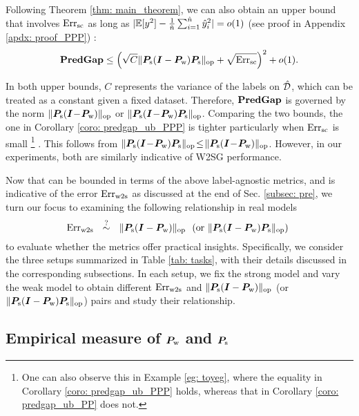 \begin{corollary}\label{coro: predgap_ub_PPP}
Following Theorem \ref{thm: main_theorem}, we can also obtain an upper bound that involves $\text{Err}_{\text{sc}}$ as long as $|\mathbb{E}[y^2]- \frac{1}{\hat{n}}\sum_{i=1}^{\hat{n}}\hat{y}_i^2 |=o(1)$ (see proof in Appendix \ref{apdx: proof_PPP}) :
$$
\textbf{PredGap}{} \leq \left( \sqrt{C} \lVert {\bm{P}}_{\text{s}} ({\bm{I}} - {\bm{P}}_{\text{w}}) {\bm{P}}_{\text{s}} \rVert_{\mathrm{op}} + \sqrt{\text{Err}_{\text{sc}}} \right)^2 + o(1).
$$
\end{corollary}
In both upper bounds, $C$ represents the variance of the labels on $\hat{{\mathcal{D}}}$, which can be treated as a constant given a fixed dataset. Therefore, $\textbf{PredGap}{}$ is governed by the norm $\lVert {\bm{P}}_{\text{s}} ({\bm{I}} \!-\!{\bm{P}}_{\text{w}} )  \rVert_{\mathrm{op}}$ or  $\lVert {\bm{P}}_{\text{s}} ({\bm{I}} \!-\! {\bm{P}}_{\text{w}}) {\bm{P}}_{\text{s}} \rVert_{\mathrm{op}} $. Comparing the two bounds, the one in Corollary \ref{coro: predgap_ub_PPP} is tighter particularly when  $\text{Err}_{\text{sc}}$ is small \footnote{One can also observe this in Example \ref{eg: toyeg}, where the equality in Corollary \ref{coro: predgap_ub_PPP} holds, whereas that in Corollary \ref{coro: predgap_ub_PP} does not.} . This follows from $\lVert {\bm{P}}_{\text{s}} ({\bm{I}}\! -\! {\bm{P}}_{\text{w}}) {\bm{P}}_{\text{s}} \rVert_{\mathrm{op}} \!\leq\! \lVert {\bm{P}}_{\text{s}} ({\bm{I}}\! -\! {\bm{P}}_{\text{w}})  \rVert_{\mathrm{op}} $. However, in our experiments, both are similarly indicative of W2SG performance.

Now that \predgap{} can be bounded in terms of the above label-agnostic metrics, and \predgap{} is indicative of the error $\text{Err}_{\text{w2s}}$ as discussed at the end of Sec. \ref{subsec: pre}, we turn our focus to examining the following relationship in real models 
$$ \text{Err}_{\text{w2s}} ~~\stackrel{?}{\sim} ~~ \lVert  {\bm{P}}_{\text{s}}({\bm{I}}-{\bm{P}}_{\text{w}})  \rVert_{\mathrm{op}} ~~\text{(or $\lVert  {\bm{P}}_{\text{s}}({\bm{I}}-{\bm{P}}_{\text{w}}) {\bm{P}}_{\text{s}}  \rVert_{\mathrm{op}}$) } 
$$ to evaluate whether the metrics offer practical insights. Specifically, we consider the three setups summarized in Table \ref{tab: tasks}, with their details discussed in the corresponding subsections. In each setup, we fix the strong model and vary the weak model to obtain different $\text{Err}_{\text{w2s}}$ and $\lVert  {\bm{P}}_{\text{s}}({\bm{I}}-{\bm{P}}_{\text{w}})  \rVert_{\mathrm{op}} $ (or $\lVert  {\bm{P}}_{\text{s}}({\bm{I}}-{\bm{P}}_{\text{w}}) {\bm{P}}_{\text{s}}  \rVert_{\mathrm{op}}$) pairs and study their relationship. 

\subsection{Empirical measure of ${\bm{P}}_{\text{w}}$ and ${\bm{P}}_{\text{s}}$}

